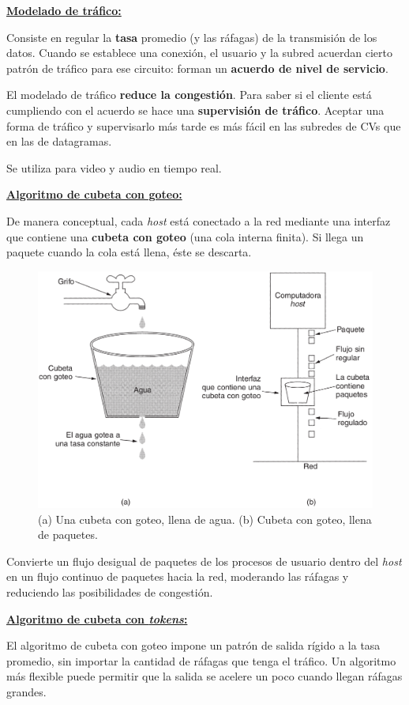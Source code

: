 \documentclass[10pt,a4paper]{article}
\begin{document}
\underline{\textbf{Modelado de tráfico:}}

Consiste en regular la \textbf{tasa} promedio (y las ráfagas) de la transmisión de los datos. Cuando se establece una conexión, el usuario y la subred acuerdan cierto
patrón de tráfico para ese circuito: forman un \textbf{acuerdo de nivel de servicio}.

El modelado de tráfico \textbf{reduce la congestión}. Para saber si el cliente está cumpliendo con el acuerdo se hace una \textbf{supervisión de tráfico}. Aceptar una forma de tráfico y supervisarlo más tarde es más fácil en las subredes de CVs que en las de datagramas.

Se utiliza para video y audio en tiempo real.

\underline{\textbf{Algoritmo de cubeta con goteo:}}

De manera conceptual, cada \textit{host} está conectado a la red mediante una interfaz que contiene una \textbf{cubeta con goteo} (una cola interna finita). Si llega un paquete cuando la cola está llena, éste se descarta.

\begin{figure}[ht!]
  \caption{(a) Una cubeta con goteo, llena de agua. (b) Cubeta con goteo, llena de paquetes.}
  \label{fig:cubeta_con_goteo}
  \centerline{\includegraphics[width=0.8\textwidth-\fboxrule-\fboxrule]{imgs/cubeta_con_goteo.png}}
\end{figure}

Convierte un flujo desigual de paquetes de los procesos de usuario dentro del \textit{host} en un flujo continuo de paquetes hacia la red, moderando las ráfagas y reduciendo las posibilidades de congestión.

\underline{\textbf{Algoritmo de cubeta con \textit{tokens}:}}

El algoritmo de cubeta con goteo impone un patrón de salida rígido a la tasa promedio, sin importar la cantidad de ráfagas que tenga el tráfico. Un algoritmo más flexible puede permitir que la salida se acelere un poco cuando llegan ráfagas grandes.
\end{document}
